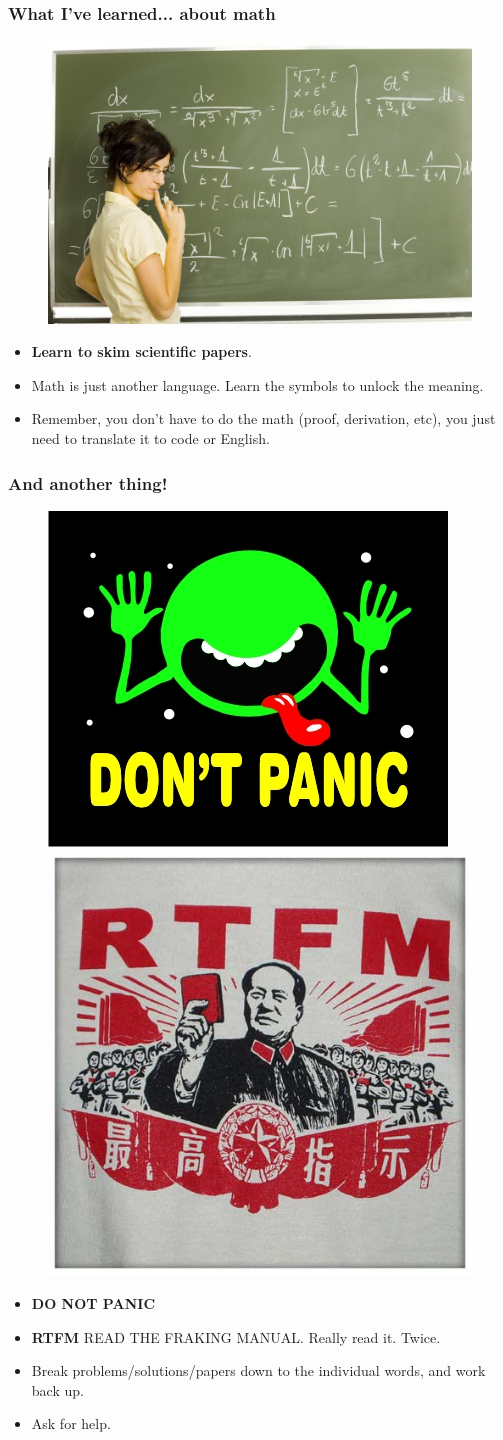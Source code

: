 \documentclass[compress]{beamer}
\begin{document}
\begin{frame}
   \frametitle{What I've learned... about math}
   \begin{figure}
     \includegraphics[width=0.5\linewidth]{math.jpg}
   \end{figure}

   \begin{itemize}
   \item \textbf{Learn to skim scientific papers}. 
     \item Math is just another language. Learn the symbols to unlock the meaning.
     
     \item Remember, you don't have to do the math (proof, derivation, etc), you just need to translate it to code or English. 
   \end{itemize}
 \end{frame}
\begin{frame}
   \frametitle{And another thing!}
   \begin{figure}
     \includegraphics[width=0.3\linewidth]{DontPanic.jpg}
     \quad 
     \includegraphics[width=0.3\linewidth]{rtfm.jpg}
   \end{figure}

   \begin{itemize}
   \item \textbf{DO NOT PANIC}
   \item \textbf{RTFM} READ THE FRAKING MANUAL. Really read it. Twice. 
   \item Break problems/solutions/papers down to the individual words, and work back up. 
   \item Ask for help.

   \end{itemize}
 \end{frame}
\end{document}
